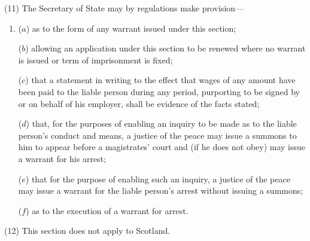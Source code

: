 \documentclass[a4paper]{article}
\begin{document}
(11)
The Secretary of State may by regulations make provision---
\begin{enumerate}\item[]
($a$) as to the form of any warrant issued under this section;

($b$) allowing an application under this section to be renewed where no warrant is issued or term of imprisonment is fixed;

($c$) that a statement in writing to the effect that wages of any amount have been paid to the liable person during any period, purporting to be signed by or on behalf of his employer, shall be evidence of the facts stated;

($d$) that, for the purposes of enabling an inquiry to be made as to the liable person’s conduct and means, a justice of the peace may issue a summons to him to appear before a magistrates’ court and (if he does not obey) may issue a warrant for his arrest;

($e$) that for the purpose of enabling such an inquiry, a justice of the peace may issue a warrant for the liable person’s arrest without issuing a summons;

($f$) as to the execution of a warrant for arrest.
\end{enumerate}

(12) This section does not apply to Scotland.


\end{document}
